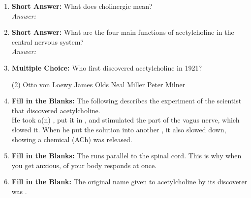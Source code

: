 \begin{enumerate}[label=\textbf{Q3.4.\arabic*}]
    \item \textbf{Short Answer:} What does cholinergic mean? \\
        \textit{Answer:} \\%

    \item \textbf{Short Answer:} What are the four main functions of acetylcholine in the central nervous system? \\
        \textit{Answer:} \\%

    \item \textbf{Multiple Choice:} Who first discovered acetylcholine in 1921?
        \begin{tasks}[label=\textcolor{\documentTheme}{(\Alph*)}, item-format=\color{\documentTheme}, label-width=1.5em, item-indent=1.7em](2)
            \task Otto von Loewy
            \task James Olds
            \task Neal Miller
            \task Peter Milner
        \end{tasks}

    \item \textbf{Fill in the Blanks:} The following describes the experiment of the scientist that discovered acetylcholine. \\
    He took a(n) \underline{\hspace{3cm}}, put it in \underline{\hspace{3cm}}, and stimulated the \underline{\hspace{3cm}} part of the vagus nerve, which slowed it. When he put the solution into another \underline{\hspace{3cm}}, it also slowed down, showing a chemical (ACh) was released.

    \item \textbf{Fill in the Blanks:} The \underline{\hspace{3cm}} runs parallel to the spinal cord. This is why when you get anxious, \underline{\hspace{3cm}} of your body responds at once.


    \item \textbf{Fill in the Blank:} The original name given to acetylcholine by its discoverer was \underline{\hspace{3cm}}.


\end{enumerate}
